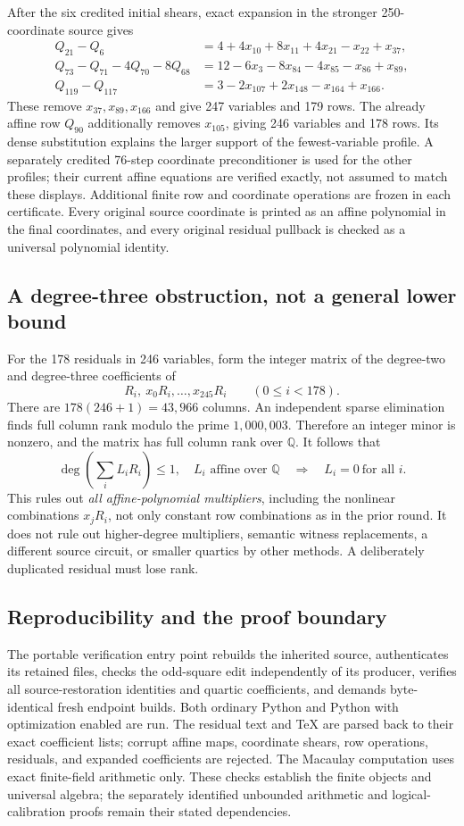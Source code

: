 After the six credited initial shears, exact expansion in the stronger
250-coordinate source gives
\begin{align*}
 Q_{21}-Q_6&=4+4x_{10}+8x_{11}+4x_{21}-x_{22}+x_{37},\\
 Q_{73}-Q_{71}-4Q_{70}-8Q_{68}
 &=12-6x_3-8x_{84}-4x_{85}-x_{86}+x_{89},\\
 Q_{119}-Q_{117}&=3-2x_{107}+2x_{148}-x_{164}+x_{166}.
\end{align*}
These remove $x_{37},x_{89},x_{166}$ and give 247 variables and 179 rows.
The already affine row $Q_{90}$ additionally removes $x_{105}$, giving
246 variables and 178 rows.  Its dense substitution explains the larger
support of the fewest-variable profile.  A separately credited 76-step
coordinate preconditioner is used for the other profiles; their current
affine equations are verified exactly, not assumed to match these displays.
Additional finite row and coordinate operations are frozen in each
certificate.  Every original source coordinate is printed as an affine
polynomial in the final coordinates, and every original residual pullback
is checked as a universal polynomial identity.

\subsection{A degree-three obstruction, not a general lower bound}
For the 178 residuals in 246 variables, form the integer matrix of the
degree-two and degree-three coefficients of
\[
 R_i,\ x_0R_i,\ldots,x_{245}R_i\qquad(0\le i<178).
\]
There are $178(246+1)=43,966$ columns.  An independent sparse elimination
finds full column rank modulo the prime $1,000,003$.  Therefore an integer
minor is nonzero, and the matrix has full column rank over $\mathbb Q$.
It follows that
\[
 \deg\!\left(\sum_i L_iR_i\right)\le1,
 \quad L_i\text{ affine over }\mathbb Q
 \quad\Longrightarrow\quad L_i=0\ \text{for all }i.
\]
This rules out \emph{all affine-polynomial multipliers}, including the
nonlinear combinations $x_jR_i$, not only constant row combinations as in
the prior round.  It does not rule out higher-degree multipliers, semantic
witness replacements, a different source circuit, or smaller quartics by
other methods.  A deliberately duplicated residual must lose rank.

\subsection{Reproducibility and the proof boundary}
The portable verification entry point rebuilds the inherited source,
authenticates its retained files, checks the odd-square edit independently
of its producer, verifies all source-restoration identities and quartic
coefficients, and demands byte-identical fresh endpoint builds.
Both ordinary Python and Python with optimization enabled are run.
The residual text and TeX are parsed back to their exact coefficient lists;
corrupt affine maps, coordinate shears, row operations, residuals, and
expanded coefficients are rejected.  The Macaulay computation uses exact
finite-field arithmetic only.  These checks establish the finite objects
and universal algebra; the separately identified unbounded arithmetic and
logical-calibration proofs remain their stated dependencies.
